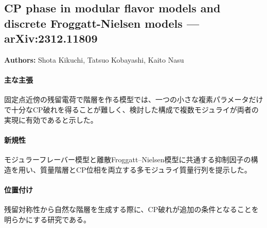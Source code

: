\subsection{CP phase in modular flavor models and discrete Froggatt-Nielsen models --- arXiv:2312.11809}

\textbf{Authors:} Shota Kikuchi, Tatsuo Kobayashi, Kaito Nasu

\paragraph{主な主張}
固定点近傍の残留電荷で階層を作る模型では、一つの小さな複素パラメータだけで十分なCP破れを得ることが難しく、検討した構成で複数モジュライが両者の実現に有効であると示した\cite{Kikuchi:2023fpl}。

\paragraph{新規性}
モジュラーフレーバー模型と離散Froggatt--Nielsen模型に共通する抑制因子の構造を用い、質量階層とCP位相を両立する多モジュライ質量行列を提示した。

\paragraph{位置付け}
残留対称性から自然な階層を生成する際に、CP破れが追加の条件となることを明らかにする研究である。
